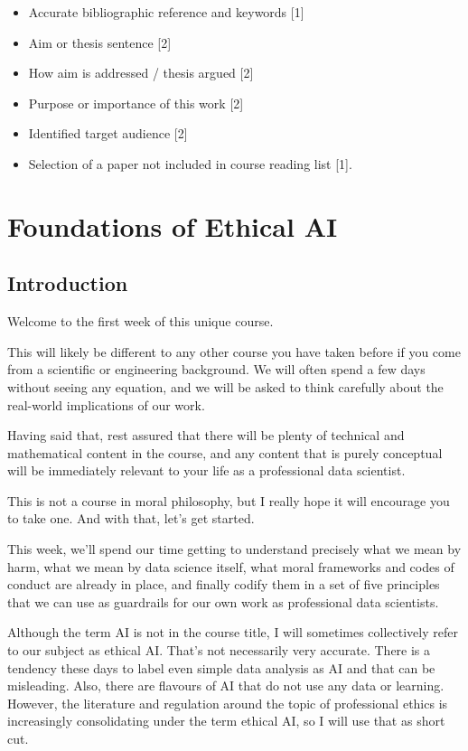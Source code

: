 \documentclass[
]{book}
\theoremstyle{definition}
\theoremstyle{definition}
\theoremstyle{definition}
\theoremstyle{definition}
\theoremstyle{remark}
\begin{document}
\begin{itemize}
\item
  Accurate bibliographic reference and keywords {[}1{]}
\item
  Aim or thesis sentence {[}2{]}
\item
  How aim is addressed / thesis argued {[}2{]}
\item
  Purpose or importance of this work {[}2{]}
\item
  Identified target audience {[}2{]}
\item
  Selection of a paper not included in course reading list {[}1{]}.
\end{itemize}

\hypertarget{ch-foundations}{%
\chapter{Foundations of Ethical AI}\label{ch-foundations}}

\hypertarget{introduction}{%
\section*{Introduction}\label{introduction}}

Welcome to the first week of this unique course.

This will likely be different to any other course you have taken before if you come from a scientific or engineering background. We will often spend a few days without seeing any equation, and we will be asked to think carefully about the real-world implications of our work.

Having said that, rest assured that there will be plenty of technical and mathematical content in the course, and any content that is purely conceptual will be immediately relevant to your life as a professional data scientist.

This is not a course in moral philosophy, but I really hope it will encourage you to take one. And with that, let's get started.

This week, we'll spend our time getting to understand precisely what we mean by harm, what we mean by data science itself, what moral frameworks and codes of conduct are already in place, and finally codify them in a set of five principles that we can use as guardrails for our own work as professional data scientists.

Although the term AI is not in the course title, I will sometimes collectively refer to our subject as ethical AI. That's not necessarily very accurate. There is a tendency these days to label even simple data analysis as AI and that can be misleading. Also, there are flavours of AI that do not use any data or learning. However, the literature and regulation around the topic of professional ethics is increasingly consolidating under the term ethical AI, so I will use that as short cut.
\end{document}
